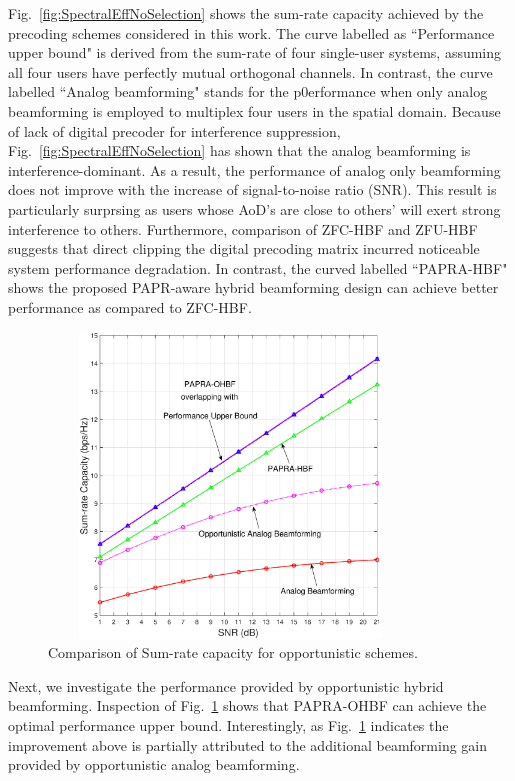 \documentclass[conference]{IEEEtran}
\begin{document}
Fig.~\ref{fig:SpectralEffNoSelection} shows the sum-rate capacity achieved by the precoding schemes considered in this work. The curve labelled as ``Performance upper bound" is derived from the sum-rate of four single-user systems, assuming all four users have perfectly mutual orthogonal channels. In contrast, the curve labelled ``Analog beamforming" stands for the p0erformance when only analog beamforming is employed to multiplex four users in the spatial domain. Because of lack of digital precoder for interference suppression, Fig.~\ref{fig:SpectralEffNoSelection} has shown that the analog beamforming is interference-dominant. As a result, the performance of analog only beamforming does not improve with the increase of signal-to-noise ratio (SNR). This result is particularly surprsing as users whose AoD's are close to others' will exert strong interference to others. Furthermore, comparison of ZFC-HBF and ZFU-HBF suggests that direct clipping the digital precoding matrix incurred noticeable system performance degradation. In contrast, the curved labelled ``PAPRA-HBF" shows the proposed PAPR-aware hybrid beamforming design can achieve better performance as compared to ZFC-HBF.

\begin{figure}[ht]
	\begin{center}
		\includegraphics[width=3.8in,height=3.2in]{Figure/SpectralEffWithSelection2.eps}
		\caption{Comparison of Sum-rate capacity for opportunistic schemes.}\label{fig:SpectralEffWithSelection}
	\end{center}
\end{figure}

Next, we investigate the performance provided by opportunistic hybrid beamforming. Inspection of Fig.~\ref{fig:SpectralEffWithSelection} shows that PAPRA-OHBF can achieve the optimal performance upper bound. Interestingly, as Fig.~\ref{fig:SpectralEffWithSelection} indicates the improvement above is partially attributed to the additional beamforming gain provided by opportunistic analog beamforming.
\end{document}
